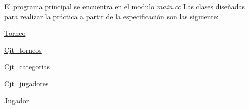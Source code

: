 El programa principal se encuentra en el modulo {\itshape main.\+cc} Las clases diseñadas para realizar la práctica a partir de la especificación son las siguiente\+: 
\begin{DoxyItemize}
\item \mbox{\hyperlink{class_torneo}{Torneo}} 
\item \mbox{\hyperlink{class_cjt__torneos}{Cjt\+\_\+torneos}} 
\item \mbox{\hyperlink{class_cjt__categorias}{Cjt\+\_\+categorias}} 
\item \mbox{\hyperlink{class_cjt__jugadores}{Cjt\+\_\+jugadores}} 
\item \mbox{\hyperlink{class_jugador}{Jugador}} 
\end{DoxyItemize}
